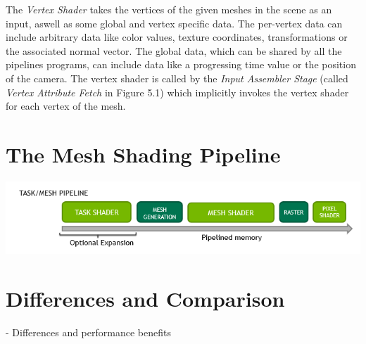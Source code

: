 
\noindent
The \emph{Vertex Shader} takes the vertices of the given meshes in the scene as an input, aswell as 
some global and vertex specific data. The per-vertex data can include arbitrary data like color values, 
texture coordinates, transformations or the associated normal vector. The global data, which can be shared
by all the pipelines programs, can include data like a progressing time value or the position of the camera.
The vertex shader is called by the \emph{Input Assembler Stage} (called \emph{Vertex Attribute Fetch} in 
Figure 5.1) which implicitly invokes the vertex shader for each vertex of the mesh. 






\section{The Mesh Shading Pipeline}


\includegraphics[width=\linewidth]{images/graphics/mesh-rendering-pipeline.png} %





\section{Differences and Comparison}

- Differences and performance benefits

